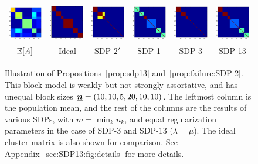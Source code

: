 \begin{figure}[t]
	\begin{tabular}{cccccc}
	\includegraphics[width=2cm]{figs/illus/M_illus} &
	\includegraphics[width=2cm]{figs/illus/IdealX} &
	\includegraphics[width=2cm]{figs/illus/X_SDP_2_illus} &
	\includegraphics[width=2cm]{figs/illus/X_SDP_1_illus} &
	\includegraphics[width=2cm]{figs/illus/X_SDP_3_illus_mu55} &
	\includegraphics[width=2cm]{figs/illus/X_SDP_13_illus_mu55}\\
	$\mathbb{E}[A]$ &‌ Ideal & SDP-2$'$ & SDP-1 & SDP-3 & SDP-13
	\end{tabular}
	
	\centering
	\caption{Illustration of Propositions~\ref{prop:sdp13} and~\ref{prop:failure:SDP-2}. This block model is weakly but not strongly assortative, and has unequal block sizes ${\underline{\bm{n}}} = (10,10,5,20,10,10)$. The leftmost column is the population mean, and the rest of the columns are the results of various SDPs, with $m = \min_k n_k$, and equal regularization parameters in the case of SDP-3 and SDP-13 ($\lambda = \mu$). The ideal cluster matrix is also shown for comparison. See Appendix~\ref{sec:SDP13:fig:details} for more details. }	
	 \label{fig:SDP13:and:everythin:else}
\end{figure}


